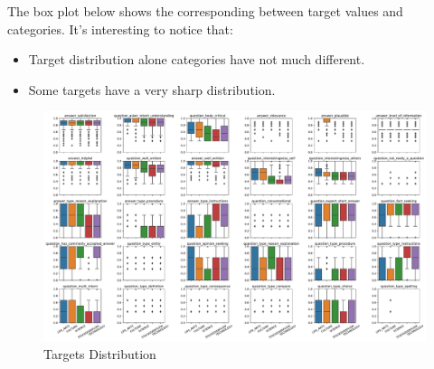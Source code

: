 The box plot below shows the corresponding between target values and categories. 
It's interesting to notice that:
\begin{itemize}
    \item Target distribution alone categories have not much different.
    \item Some targets have a very sharp distribution.
\end{itemize}
\begin{figure}[htbp]
    \centering
    \centering
    \includegraphics[width=\linewidth]{figures/target_category_distribution.pdf}
    \caption{Targets Distribution}
    \label{fig:targets}
\end{figure}
